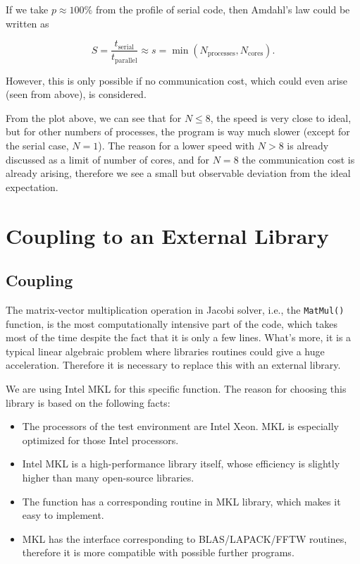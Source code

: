 \documentclass{article}
\begin{document}
\begin{spacing}{1.1}
If we take $p \approx 100\%$ from the profile of serial code, then Amdahl's law could be written as

\[S=\frac{t_\mathrm{serial}}{t_\mathrm{parallel}} \approx s = \min{(N_\mathrm{processes}, N_\mathrm{cores})}.\]

However, this is only possible if no communication cost, which could even arise (seen from above), is considered.

From the plot above, we can see that for $N \leq 8$, the speed is very close to ideal, but for other numbers of processes, the program is way much slower (except for the serial case, $N=1$). The reason for a lower speed with $N > 8$ is already discussed as a limit of number of cores, and for $N = 8$ the communication cost is already arising, therefore we see a small but observable deviation from the ideal expectation.

\section{Coupling to an External Library}

\subsection{Coupling}

The matrix-vector multiplication operation in Jacobi solver, i.e., the \texttt{MatMul()} function, is the most computationally intensive part of the code, which takes most of the time despite the fact that it is only a few lines. What's more, it is a typical linear algebraic problem where libraries routines could give a huge acceleration. Therefore it is necessary to replace this with an external library.

We are using Intel MKL for this specific function. The reason for choosing this library is based on the following facts:
\begin{itemize}
    \item The processors of the test environment are Intel Xeon. MKL is especially optimized for those Intel processors.
    \item Intel MKL is a high-performance library itself, whose efficiency is slightly higher than many open-source libraries.
    \item The function has a corresponding routine in MKL library, which makes it easy to implement.
    \item MKL has the interface corresponding to BLAS/LAPACK/FFTW routines, therefore it is more compatible with possible further programs.
\end{itemize}


\end{spacing}
\end{document}
